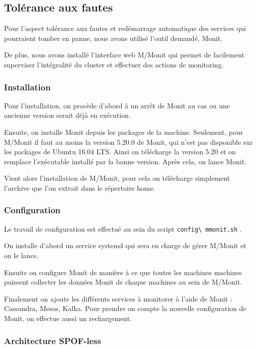 \documentclass[a4paper, 11pt, titlepage]{article}
\begin{document}
\subsection {Tolérance aux fautes}

Pour l'aspect tolérance aux fautes et redémarrage automatique des services qui pourraient tomber en panne, nous avons utilisé l'outil demandé, Monit.

De plus, nous avons installé l'interface web M/Monit qui permet de facilement superviser l'intégralité du cluster et effectuer des actions de monitoring.


\subsubsection {Installation}

Pour l'installation, on procède d'abord à un arrêt de Monit au cas ou une ancienne version serait déjà en exécution.

Ensuite, on installe Monit depuis les packages de la machine. Seulement, pour M/Monit il faut au moins la version 5.20.0 de Monit, qui n'est pas disponible sur les packages de Ubuntu 16.04 LTS. Ainsi on télécharge la version 5.20 et on remplace l'exécutable installé par la bonne version. Après cela, on lance Monit.

Vient alors l'installation de M/Monit, pour cela on télécharge simplement l'archive que l'on extrait dans le répertoire home.


\subsubsection {Configuration}

Le travail de configuration est effectué au sein du script \lstinline!config\ mmonit.sh! .

On installe d'abord un service systemd qui sera en charge de gérer M/Monit et on le lance.

Ensuite on configure Monit de manière à ce que toutes les machines machines puissent collecter les données Monit de chaque machines au sein de M/Monit.

Finalement on ajoute les différents services à monitorer à l'aide de Monit : Cassandra, Mesos, Kafka.
Pour prendre on compte la nouvelle configuration de Monit, on effectue aussi un rechargement.


\subsubsection {Architecture SPOF-less}
\end{document}
